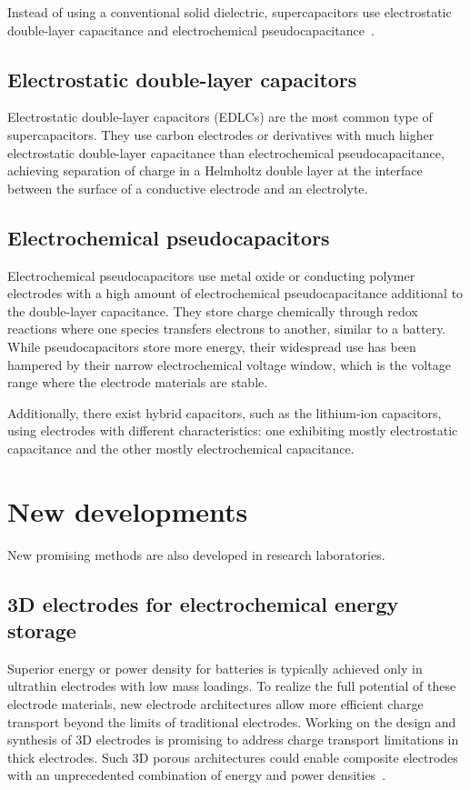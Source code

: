 \documentclass{EPL-master-thesis-covers-EN}
\begin{document}
Instead of using a conventional solid dielectric, supercapacitors use electrostatic double-layer capacitance and electrochemical pseudocapacitance~\cite{2019JPS...414..420B}.

\subsection*{Electrostatic double-layer capacitors}

Electrostatic double-layer capacitors (EDLCs) are the most common type of supercapacitors. They use carbon electrodes or derivatives with much higher electrostatic double-layer capacitance than electrochemical pseudocapacitance, achieving separation of charge in a Helmholtz double layer at the interface between the surface of a conductive electrode and an electrolyte.

\subsection*{Electrochemical pseudocapacitors}

Electrochemical pseudocapacitors use metal oxide or conducting polymer electrodes with a high amount of electrochemical pseudocapacitance additional to the double-layer capacitance. They store charge chemically through redox reactions where one species transfers electrons to another, similar to a battery. While pseudocapacitors store more energy, their widespread use has been hampered by their narrow electrochemical voltage window, which is the voltage range where the electrode materials are stable.

Additionally, there exist hybrid capacitors, such as the lithium-ion capacitors, using electrodes with different characteristics: one exhibiting mostly electrostatic capacitance and the other mostly electrochemical capacitance.

\section{New developments}

New promising methods are also developed in research laboratories.

\subsection*{3D electrodes for electrochemical energy storage}

Superior energy or power density for batteries is typically achieved only in ultrathin electrodes with low mass loadings. To realize the full potential of these electrode materials, new electrode architectures allow more efficient charge transport beyond the limits of traditional electrodes. Working on the design and synthesis of 3D electrodes is promising to address charge transport limitations in thick electrodes. Such 3D porous architectures could enable composite electrodes with an unprecedented combination of energy and power densities~\cite{Sun2019}.
\end{document}
